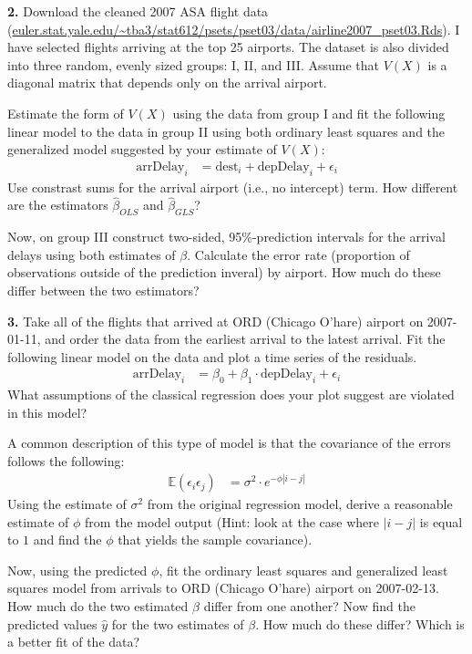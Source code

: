 \documentclass[12pt]{article}
\begin{document}
{\bf 2.} Download the cleaned 2007 ASA flight data
(\url{euler.stat.yale.edu/~tba3/stat612/psets/pset03/data/airline2007_pset03.Rds}).
I have selected flights arriving at the top 25 airports. The dataset is
also divided into three random, evenly sized groups: I, II, and III.
Assume that $V(X)$ is a diagonal matrix that depends only on the arrival airport.

Estimate the form of $V(X)$ using the data from group I and fit the following linear
model to the data in group II using both ordinary least squares and the generalized
model suggested by your estimate of $V(X)$:
\begin{align}
\text{arrDelay}_i &= \text{dest}_i + \text{depDelay}_i + \epsilon_i \label{airlineMod}
\end{align}
Use constrast sums for the arrival airport (i.e., no intercept) term. How different
are the estimators $\widehat{\beta}_{OLS}$ and $\widehat{\beta}_{GLS}$?

Now, on group III construct two-sided, 95\%-prediction intervals for the arrival
delays using both estimates of $\beta$. Calculate the error rate (proportion of
observations outside of the prediction inveral) by airport. How much do
these differ between the two estimators?

{\bf 3.} Take all of the flights that arrived at ORD (Chicago O'hare) airport on
2007-01-11, and order the data from the earliest arrival to the latest arrival.
Fit the following linear model on the data and plot a time series of the residuals.
\begin{align}
\text{arrDelay}_i &= \beta_0 + \beta_1\cdot\text{depDelay}_i + \epsilon_i
\end{align}
What assumptions of the classical regression does your plot suggest are
violated in this model?

A common description of this type of model is that the covariance of the errors
follows the following:
\begin{align}
\mathbb{E}(\epsilon_i \epsilon_j) &= \sigma^2 \cdot e^{- \phi |i - j|}
\end{align}
Using the estimate of $\sigma^2$ from the original regression model, derive
a reasonable estimate of $\phi$ from the model output (Hint: look at the case
where $|i-j|$ is equal to $1$ and find the $\phi$ that yields the
sample covariance).

Now, using the predicted $\phi$, fit the ordinary least squares and generalized
least squares model from arrivals to ORD (Chicago O'hare) airport on 2007-02-13.
How much do the two estimated $\widehat{\beta}$ differ from one another? Now find the
predicted values $\widehat{y}$ for the two estimates of $\beta$. How much do
these differ? Which is a better fit of the data?
\end{document}
